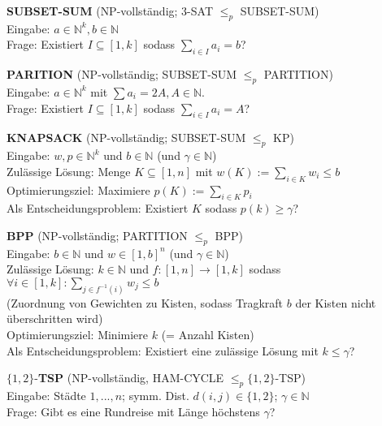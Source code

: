 \documentclass[a4paper,graphics,11pt]{article}
\begin{document}
\strut

\textbf{SUBSET-SUM} (\textsf{NP}-vollständig; 3-SAT $\leq_p$ SUBSET-SUM)
\\[5pt]
Eingabe: $a \in \mathbb{N}^k, b \in \mathbb{N}$
\\[5pt]
Frage: Existiert $I \subseteq [1,k]$ sodass $\displaystyle \sum_{i \in I}a_i = b$?

\strut

\textbf{PARITION} (\textsf{NP}-vollständig; SUBSET-SUM $\leq_p$ PARTITION)
\\[5pt]
Eingabe: $a \in \mathbb{N}^k$ mit $\sum a_i = 2A, A \in \mathbb{N}$.
\\[5pt]
Frage: Existiert $I \subseteq [1,k]$ sodass $\displaystyle \sum_{i \in I}a_i = A$?

\newpage

\textbf{KNAPSACK} (\textsf{NP}-vollständig; SUBSET-SUM $\leq_p$ KP)
\\[10pt]
Eingabe: $w,p \in \mathbb{N}^k$ und $b\in \mathbb{N}$ (und $\gamma \in \mathbb{N}$)
\\[10pt]
Zulässige Lösung: Menge $K \subseteq [1,n]$ mit $w(K) := \sum_{i \in K} w_i \leq b$
\\[10pt]
Optimierungsziel: Maximiere $p(K) := \sum_{i \in K} p_i$
\\[10pt]
Als Entscheidungsproblem: Existiert $K$ sodass $p(k) \geq \gamma$?

\strut

\textbf{BPP} (\textsf{NP}-vollständig; PARTITION $\leq_p$ BPP)
\\[10pt]
Eingabe: $b \in \mathbb{N}$ und $w \in [1,b]^n$ (und $\gamma \in \mathbb{N}$)
\\[10pt]
Zulässige Lösung: $k \in \mathbb{N}$ und $f : [1,n] \to [1,k]$ sodass
$\displaystyle\forall i \in [1,k]: \sum_{j \in f^{-1}(i)} w_j \leq b$\\
(Zuordnung von Gewichten zu Kisten, sodass Tragkraft $b$ der Kisten nicht überschritten wird)
\\[10pt]
Optimierungsziel: Minimiere $k$ (= Anzahl Kisten)
\\[10pt]
Als Entscheidungsproblem: Existiert eine zulässige Lösung mit $k \leq \gamma$?

\strut

$\{1,2\}$-\textbf{TSP} (\textsf{NP}-vollständig, HAM-CYCLE $\leq_p \{1,2\}$-TSP)
\\[5pt]
Eingabe: Städte $1,...,n$; symm. Dist. $d(i,j) \in \{1,2\}$; $\gamma \in \mathbb{N}$
\\[5pt]
Frage: Gibt es eine Rundreise mit Länge höchstens $\gamma$?
\end{document}
